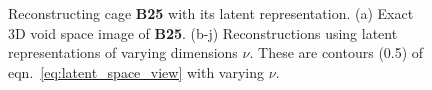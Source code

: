 \documentclass[journal=jacsat,manuscript=article,layout=traditional]{achemso}
\begin{document}
\begin{figure}
	\qquad
	\caption{Reconstructing cage \textbf{B25} with its latent representation. (a) Exact 3D void space image of \textbf{B25}. (b-j) Reconstructions using latent representations of varying dimensions $\nu$. These are contours (0.5) of eqn.~\ref{eq:latent_space_view} with varying $\nu$.
	} \label{fig:cage_reconstruction}
\end{figure}
\end{document}
